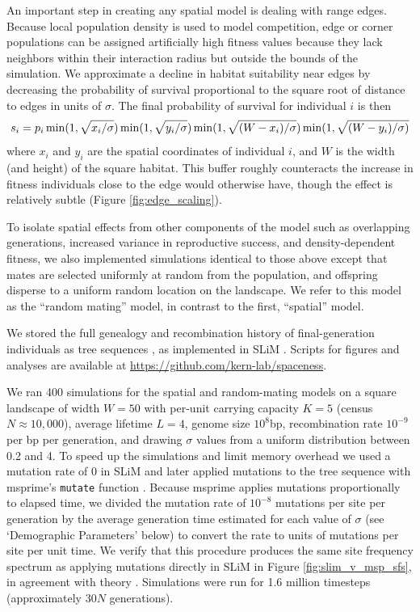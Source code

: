 \documentclass[10pt,twoside,lineno,hidelinks]{preprint}
\begin{document}
An important step in creating any spatial model is dealing with range edges. 
Because local population density is used to model competition, edge or corner populations can be assigned artificially high fitness values 
because they lack neighbors within their interaction radius but outside the bounds of the simulation.
We approximate a decline in habitat suitability near edges by decreasing the probability of survival proportional to the square root of distance to edges in units of $\sigma$. 
The final probability of survival for individual $i$ is then
\begin{equation}
    s_{i} = p_{i} 
        \min(1,\sqrt{x_{i}/\sigma})
        \min(1,\sqrt{y_{i}/\sigma})\\
        \min(1,\sqrt{(W - x_{i})/\sigma})
        \min(1,\sqrt{(W - y_{i})/\sigma)}
\end{equation}
where $x_i$ and $y_i$ are the spatial coordinates of individual $i$, and $W$ is the width (and height) of the square habitat.
This buffer roughly counteracts the increase in fitness individuals close to the edge would otherwise have, though the effect is relatively subtle (Figure \ref{fig:edge_scaling}).

To isolate spatial effects from other components of the model such as overlapping generations, increased variance in reproductive success, and density-dependent fitness,  
we also implemented simulations identical to those above except that mates are selected uniformly at random from the population,
and offspring disperse to a uniform random location on the landscape. 
We refer to this model as the ``random mating'' model, in contrast to the first, ``spatial'' model. 

We stored the full genealogy and recombination history of final-generation individuals as tree sequences \citep{Kelleher2018},
as implemented in SLiM \citep{haller2019treesequence}. 
Scripts for figures and analyses are available at \url{https://github.com/kern-lab/spaceness}.  

We ran 400 simulations for the spatial and random-mating models on a square landscape of width $W=50$  
with per-unit carrying capacity $K=5$ (census $N \approx 10,000$), 
average lifetime $L=4$, 
genome size $10^{8}$bp, 
recombination rate $10^{-9}$ per bp per generation, 
and drawing $\sigma$ values from a uniform distribution between 0.2 and 4. 
To speed up the simulations and limit memory overhead we used a mutation rate of 0 in SLiM 
and later applied mutations to the tree sequence with msprime's \texttt{mutate} function \citep{Kelleher2016}. 
Because msprime applies mutations proportionally to elapsed time,
we divided the mutation rate of $10^{-8}$ mutations per site per generation
by the average generation time estimated for each value of $\sigma$ (see `Demographic Parameters' below) to convert the rate to units of mutations per site per unit time. 
We verify that this procedure produces the same site frequency spectrum as applying mutations directly in SLiM in Figure \ref{fig:slim_v_msp_sfs},
in agreement with theory \citep{ralph2019efficiently}.
Simulations were run for 1.6 million timesteps (approximately $30N$ generations). 
\end{document}

